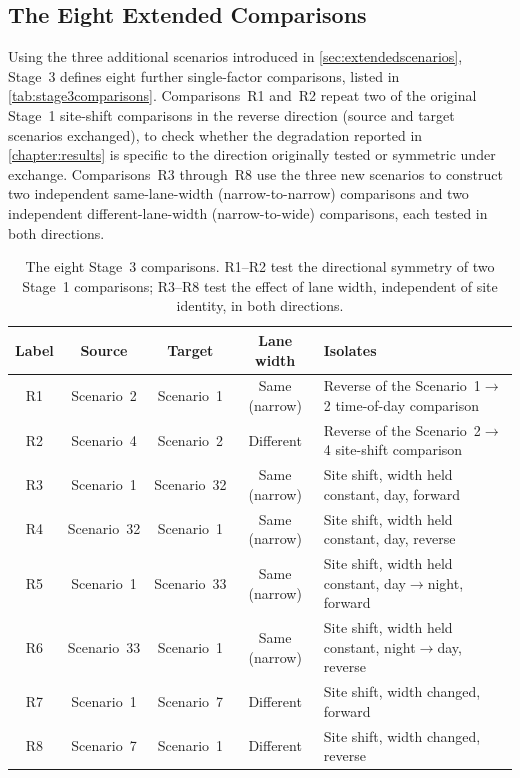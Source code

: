 \documentclass{iutbscthesis}
\begin{document}
\subsection{The Eight Extended Comparisons}

Using the three additional scenarios introduced in \autoref{sec:extendedscenarios}, Stage~3 defines eight further single-factor comparisons, listed in \autoref{tab:stage3comparisons}. Comparisons~R1 and~R2 repeat two of the original Stage~1 site-shift comparisons in the reverse direction (source and target scenarios exchanged), to check whether the degradation reported in \autoref{chapter:results} is specific to the direction originally tested or symmetric under exchange. Comparisons~R3 through~R8 use the three new scenarios to construct two independent same-lane-width (narrow-to-narrow) comparisons and two independent different-lane-width (narrow-to-wide) comparisons, each tested in both directions.

\begin{table}[H]
    \centering
    \begin{tabular}{c c c c p{}}
        \toprule
        Label & Source & Target & Lane width & Isolates \\
        \midrule
        R1 & Scenario~2 & Scenario~1 & Same (narrow) & Reverse of the Scenario~1$\to$2 time-of-day comparison \\
        R2 & Scenario~4 & Scenario~2 & Different & Reverse of the Scenario~2$\to$4 site-shift comparison \\
        R3 & Scenario~1 & Scenario~32 & Same (narrow) & Site shift, width held constant, day, forward \\
        R4 & Scenario~32 & Scenario~1 & Same (narrow) & Site shift, width held constant, day, reverse \\
        R5 & Scenario~1 & Scenario~33 & Same (narrow) & Site shift, width held constant, day$\to$night, forward \\
        R6 & Scenario~33 & Scenario~1 & Same (narrow) & Site shift, width held constant, night$\to$day, reverse \\
        R7 & Scenario~1 & Scenario~7 & Different & Site shift, width changed, forward \\
        R8 & Scenario~7 & Scenario~1 & Different & Site shift, width changed, reverse \\
        \bottomrule
    \end{tabular}
    \caption{The eight Stage~3 comparisons. R1--R2 test the directional symmetry of two Stage~1 comparisons; R3--R8 test the effect of lane width, independent of site identity, in both directions.}
    \label{tab:stage3comparisons}
\end{table}
\end{document}
